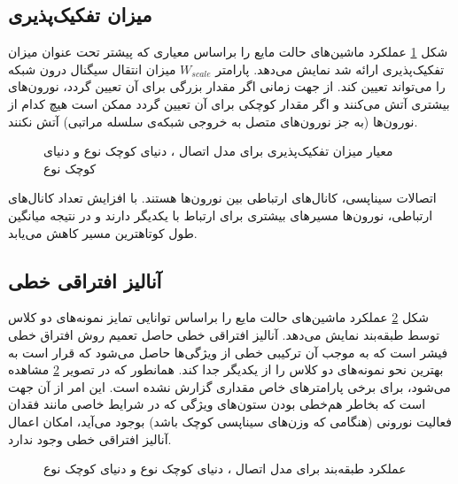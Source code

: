 \subsection{میزان تفکیک‌پذیری}
شکل \ref{fig:separation} عملکرد ماشین‌های حالت مایع را براساس معیاری که پیشتر تحت عنوان میزان تفکیک‌پذیری ارائه شد نمایش می‌دهد. پارامتر $W_{scale}$ میزان انتقال سیگنال درون شبکه را می‌تواند تعیین کند. از جهت زمانی اگر مقدار بزرگی برای آن تعیین گردد، نورون‌های بیشتری آتش می‌کنند و اگر مقدار کوچکی برای آن تعیین گردد ممکن است هیچ کدام از نورون‌ها (به جز نورون‌های متصل به خروجی شبکه‌ی سلسله مراتبی) آتش نکنند. 


\begin{figure}
\centering
{\footnotesize
{}

\caption[میزان تفکیک‌پذیری برای مدل‌های اتصال]{معیار میزان تفکیک‌پذیری برای مدل اتصال  ،  دنیای کوچک نوع  و   دنیای کوچک نوع }
\label{fig:separation}
}
\end{figure}

اتصالات سیناپسی، کانال‌های ارتباطی بین نورون‌ها هستند. با افزایش تعداد کانال‌های ارتباطی، نورون‌ها مسیرهای بیشتری برای ارتباط با یکدیگر دارند و در نتیجه میانگین طول کوتاهترین مسیر کاهش می‌یابد. 


\subsection{آنالیز افتراقی خطی}
شکل \ref{fig:lda} عملکرد ماشین‌های حالت مایع را براساس توانایی تمایز نمونه‌های دو کلاس توسط طبقه‌بند  نمایش می‌دهد. آنالیز افتراقی خطی حاصل تعمیم روش افتراق خطی فیشر است که به موجب آن ترکیبی خطی از ویژگی‌ها حاصل می‌شود که قرار است به بهترین نحو نمونه‌های دو کلاس را از یکدیگر جدا کند. همانطور که در تصویر \ref{fig:lda} مشاهده می‌شود، برای برخی پارامتر‌های خاص مقداری گزارش نشده است. این امر از آن جهت است که بخاطر هم‌خطی بودن ستون‌های ویژگی که در شرایط خاصی مانند فقدان فعالیت نورونی (هنگامی که وزن‌های سیناپسی کوچک باشد) بوجود می‌آید، امکان اعمال آنالیز افتراقی خطی وجود ندارد.

\begin{figure}
\centering
{\footnotesize
{}

\caption[عملکرد طبقه‌بند  برای مدل‌های اتصال]{عملکرد طبقه‌بند  برای مدل اتصال  ،  دنیای کوچک نوع  و   دنیای کوچک نوع }
\label{fig:lda}
}
\end{figure}


